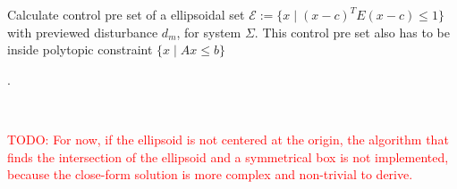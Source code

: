 \documentclass{article}
\begin{document}
\begin{algorithm}[H]
	\centering
	\caption{Calculate control pre set of a ellipsoidal set $\mathcal E := \{x\;|\;(x-c)^T E (x-c) \leq 1\}$ with previewed disturbance $d_m$, for system $\Sigma$. This control pre set also has to be inside polytopic constraint $\{x\;| \; Ax \leq b \}$}.
	\begin{algorithmic}[1]
		\State{}
		\\
		\EndFunction
	\end{algorithmic}
	\label{alg_pre_preview}
\end{algorithm}

\textcolor{red}{TODO: For now, if the ellipsoid is not centered at the origin, the algorithm that finds the intersection of the ellipsoid  and a symmetrical box is not implemented, because the close-form solution is more complex and non-trivial to derive.}
\end{document}
